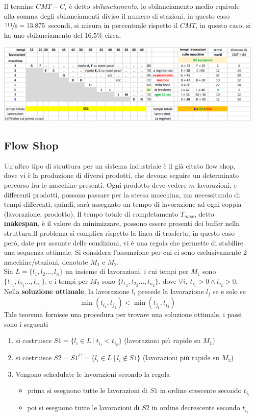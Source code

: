 \documentclass[10pt, letterpaper]{report}
\begin{document}
Il termine $CMT-C_i$ è detto \textit{sbilanciamento}, lo sbilanciamento medio equivale  
alla somma degli sbilanciamenti diviso il numero di stazioni, in questo caso $\nicefrac{111}{8}=13.875$ secondi, 
si misura in percentuale rispetto il $CMT$, in questo caso, si ha uno sbilanciamento del $16.5\%$ circa.
\begin{center}
    \includegraphics[width=1\textwidth ]{images/gantt.png}
\end{center}
\subsection{Flow Shop}
Un'altro tipo di struttura per un sistema industriale è il già citato flow shop, dove vi è la produzione 
di diversi prodotti, che devono seguire un determinato percorso fra le macchine presenti. Ogni prodotto 
deve vedere $m$ lavorazioni, e differenti prodotti, possono passare per la stessa macchina, ma 
necessitando di tempi differenti, quindi, sarà assegnato un tempo di lavorazione ad ogni 
coppia (lavorazione, prodotto). Il tempo totale di completamento $T_{max}$, detto \textbf{makespan}, è il 
valore da minimizzare, possono essere presenti dei buffer nella struttura.\acc Il problema si complica 
rispetto la linea di trasferta, in questo caso però, date per assunte delle condizioni, vi è una regola che permette 
di stabilire una sequenza ottimale.\acc 
{}
Si considera l'assunzione per cui ci sono esclusivamente 2 macchine/stazioni, denotate $M_1$ e $M_2$.\\
Sia $L=\{l_1,l_2\dots,l_n\}$ un insieme di lavorazioni, i  cui tempi per $M_1$ sono 
$\{t_{1_1},t_{2_1}\dots,t_{n_1}\}$, e i tempi per $M_2$ sono 
$\{t_{1_2},t_{2_2}\dots,t_{n_2}\}$. dove $\forall i, \ t_{i_1}>0\land t_{i_2}>0$. Nella \textbf{soluzione ottimale}, 
la lavorazione $l_i$ precede la lavorazione $l_j$ se e solo se 
$$ \min(t_{i_1},t_{j_2})<\min(t_{j_1},t_{i_2})$$
Tale teorema fornisce una procedura per trovare una soluzione ottimale, i passi sono i seguenti \begin{enumerate}
    \item si costruisce $S1=\{l_i\in L \ | \ t_{i_1}<t_{i_2}\}$ (lavorazioni più rapide su $M_1$)
    \item si costruisce $S2=S1^C=\{l_i\in L \ | \ l_i\notin S1\}$ (lavorazioni più rapide su $M_2$)
    \item Vengono schedulate le lavorazioni secondo la regola\begin{itemize}
        \item prima si eseguono tutte le lavorazioni di $S1$ in ordine crescente secondo $t_{i_1}$
        \item poi si eseguono tutte le lavorazioni di $S2$ in ordine decrescente secondo $t_{i_2}$
    \end{itemize}
\end{enumerate}
\end{document}
